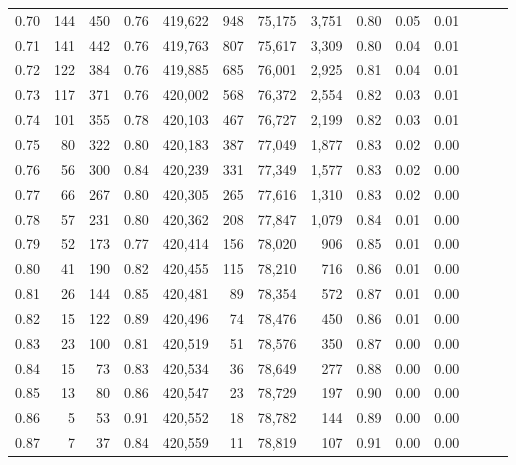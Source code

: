 \begin{tabular}{rrrrrrrrrrrrrr}
0.70 &     144 &    450 &  0.76 &  419,622 &      948 &  75,175 &   3,751 &  0.80 &  0.05 &      0.01 \\
0.71 &     141 &    442 &  0.76 &  419,763 &      807 &  75,617 &   3,309 &  0.80 &  0.04 &      0.01 \\
0.72 &     122 &    384 &  0.76 &  419,885 &      685 &  76,001 &   2,925 &  0.81 &  0.04 &      0.01 \\
0.73 &     117 &    371 &  0.76 &  420,002 &      568 &  76,372 &   2,554 &  0.82 &  0.03 &      0.01 \\
0.74 &     101 &    355 &  0.78 &  420,103 &      467 &  76,727 &   2,199 &  0.82 &  0.03 &      0.01 \\
0.75 &      80 &    322 &  0.80 &  420,183 &      387 &  77,049 &   1,877 &  0.83 &  0.02 &      0.00 \\
0.76 &      56 &    300 &  0.84 &  420,239 &      331 &  77,349 &   1,577 &  0.83 &  0.02 &      0.00 \\
0.77 &      66 &    267 &  0.80 &  420,305 &      265 &  77,616 &   1,310 &  0.83 &  0.02 &      0.00 \\
0.78 &      57 &    231 &  0.80 &  420,362 &      208 &  77,847 &   1,079 &  0.84 &  0.01 &      0.00 \\
0.79 &      52 &    173 &  0.77 &  420,414 &      156 &  78,020 &     906 &  0.85 &  0.01 &      0.00 \\
0.80 &      41 &    190 &  0.82 &  420,455 &      115 &  78,210 &     716 &  0.86 &  0.01 &      0.00 \\
0.81 &      26 &    144 &  0.85 &  420,481 &       89 &  78,354 &     572 &  0.87 &  0.01 &      0.00 \\
0.82 &      15 &    122 &  0.89 &  420,496 &       74 &  78,476 &     450 &  0.86 &  0.01 &      0.00 \\
0.83 &      23 &    100 &  0.81 &  420,519 &       51 &  78,576 &     350 &  0.87 &  0.00 &      0.00 \\
0.84 &      15 &     73 &  0.83 &  420,534 &       36 &  78,649 &     277 &  0.88 &  0.00 &      0.00 \\
0.85 &      13 &     80 &  0.86 &  420,547 &       23 &  78,729 &     197 &  0.90 &  0.00 &      0.00 \\
0.86 &       5 &     53 &  0.91 &  420,552 &       18 &  78,782 &     144 &  0.89 &  0.00 &      0.00 \\
0.87 &       7 &     37 &  0.84 &  420,559 &       11 &  78,819 &     107 &  0.91 &  0.00 &      0.00 \\

\end{tabular}
